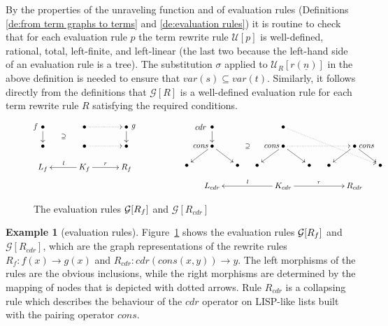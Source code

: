 \documentclass{eptcs}
\theoremstyle{plain}
\theoremstyle{definition}
\newtheorem{example}[theorem]{Example}
\begin{document}
By the properties of the unraveling function and of evaluation rules 
(Definitions 
\ref{de:from term graphs to terms} and \ref{de:evaluation rules})
it is routine to check that for each 
evaluation rule $p$ the term rewrite rule $\mathcal{U}[p]$ is 
well-defined,
rational, total, left-finite, and left-linear (the last two because 
the left-hand side of an evaluation rule is a tree). The substitution 
$\sigma$ applied to $\mathcal{U}_R[r(\underline{n})]$ in the above 
definition is needed to ensure that $var(s) \subseteq var(t)$.
Similarly, it follows directly from the definitions that $\mathcal{G}[R]$ 
is 
a well-defined evaluation rule for each term rewrite rule $R$ 
satisfying the 
required conditions.

\begin{figure}[t]
$$    \SelectTips {cm}{}\xymatrix@=3ex{
{ \save []-<.3cm, .0cm>*\txt{\emph{f}}\restore \bullet \ar[d]}
     &     &  \bullet\ar@{}[dll]|\supseteq \ar@{..>}[rr]
                     &    &   {\save []+<.3cm, .0cm>*\txt{\emph{g}} \restore \bullet \ar[d]}   
                                \\
  \bullet
     &     & \bullet\ar@{..>}[rr]
                     &    &  \bullet\\
L_f & & K_f \ar[ll]_l \ar[rr]^r & & R_f 
}
\hspace{2cm}    \SelectTips {cm}{}\xymatrix@=3ex{
&  { \save []-<.5cm, .0cm>*\txt{\emph{cdr}}\restore \bullet \ar[d]}
          &     &     &  {\bullet\ar@{..>}[rrrrdd]}  &     &     &    \\
&  { \save []-<.5cm, .0cm>*\txt{\emph{cons}}\restore \bullet \ar[dl] \ar[dr]}
          &     &     &   { \save []-<.5cm, .0cm>*\txt{\emph{cons}}\restore \bullet \ar[dl] \ar[dr] \ar@{..>}[rrr]\ar@{}[lll]|\supseteq}
                           &     &   & { \save []+<.5cm, .0cm>*\txt{\emph{cons}}\restore \bullet \ar[dl] \ar[dr]}
                                       &    \\
{ \bullet}   
    &     &  {\bullet}
                &   {\bullet}
                      &    &  {\bullet}
                                 &  {\bullet}
                                       &    & {\bullet}\\
&L_{cdr} & & & K_{cdr} \ar[lll]_{l} \ar[rrr]^r & & & R_{cdr} 
}
$$

\caption{The evaluation rules ${\cal
  G}[R_f]$ and $\mathcal{G}[R_{cdr}]$}
  \protect\label{fi:evaluationRules}
\end{figure}

\begin{example}[evaluation rules]
\label{ex:rules}
Figure~\ref{fi:evaluationRules} shows the evaluation rules ${\cal
  G}[R_f]$ and $\mathcal{G}[R_{cdr}]$, which are the graph
representations of the rewrite rules $R_f: f(x) \to g(x)$ and
$R_{cdr}: cdr(cons(x,y)) \to y$. The left morphisms of the rules are
the obvious inclusions, while the right morphisms are determined by
the mapping of nodes that is depicted with dotted arrows.
Rule $R_{cdr}$ is a collapsing rule which
describes the behaviour of the $cdr$ operator on {\sc LISP}-like lists
built with the pairing operator $cons$.
\end{example}
\end{document}
